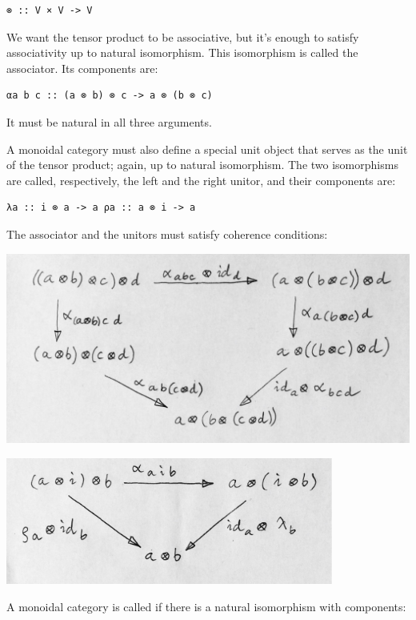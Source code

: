 \begin{verbatim}
⊗ :: V × V -> V
\end{verbatim}

We want the tensor product to be associative, but it's enough to satisfy
associativity up to natural isomorphism. This isomorphism is called the
associator. Its components are:

\begin{verbatim}
αa b c :: (a ⊗ b) ⊗ c -> a ⊗ (b ⊗ c)
\end{verbatim}

It must be natural in all three arguments.

A monoidal category must also define a special unit object 
that serves as the unit of the tensor product; again, up to natural
isomorphism. The two isomorphisms are called, respectively, the left and
the right unitor, and their components are:

\begin{verbatim}
λa :: i ⊗ a -> a ρa :: a ⊗ i -> a
\end{verbatim}

The associator and the unitors must satisfy coherence conditions:

\includegraphics[width=5.31250in]{images/assoc.jpg}

\includegraphics[width=4.23958in]{images/idcoherence.jpg}

A monoidal category is called  if there is a natural
isomorphism with components:

